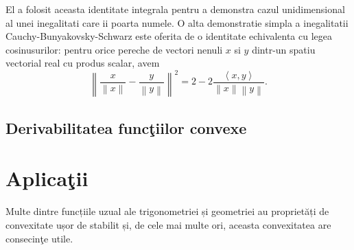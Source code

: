\documentclass[a4paper,12pt,oneside]{report}
\begin{document}
	El a folosit aceasta identitate integrala pentru a demonstra cazul unidimensional al unei inegalitati care ii poarta numele. O alta demonstratie simpla a inegalitatii Cauchy-Bunyakovsky-Schwarz este oferita  de o identitate echivalenta cu legea cosinusurilor: pentru orice pereche de vectori nenuli \(x\) si \(y\) dintr-un spatiu vectorial real cu produs scalar, avem
\begin{displaymath}
  \left \| \frac{x}{\left \| x \right \|} - \frac{y}{\left \| y \right \|}\right \|^{2} = 2 - 2\frac{\left \langle x , y \right \rangle}{\left \| x \right \|\left \| y \right \|}.
\end{displaymath}

\section{Derivabilitatea func\c{t}iilor convexe}

%
%
%
%


\chapter{Aplica\c{t}ii}

Multe dintre funcțiile uzual ale trigonometriei și geometriei au proprietăți de convexitate ușor de stabilit și, de cele mai multe ori, aceasta convexitatea are consecinţe utile.
\end{document}
